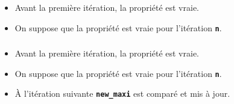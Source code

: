 \documentclass[svgnames,11pt]{beamer}
\begin{document}
\begin{frame}
    \frametitle{}

    \begin{center}
    \end{center}
\begin{itemize}
    \item Avant la première itération, la propriété est vraie.
    \item On suppose que la propriété est vraie pour l'itération \textbf{\texttt{n}}.
\end{itemize}
\end{frame}
\begin{frame}
    \frametitle{}

    \begin{center}
    \end{center}
\begin{itemize}
    \item Avant la première itération, la propriété est vraie.
    \item On suppose que la propriété est vraie pour l'itération \textbf{\texttt{n}}.
    \item À l'itération suivante \textbf{\texttt{new\_maxi}} est comparé et mis à jour.
\end{itemize}
\end{frame}
\end{document}
